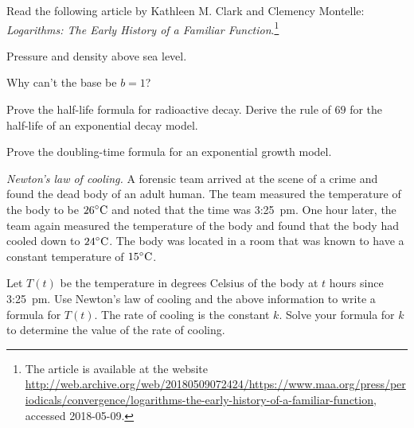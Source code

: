 \documentclass[a4paper,oneside,12pt]{article}
\begin{document}
\begin{problem}
\item Read the following article by Kathleen M. Clark and Clemency
  Montelle:
  \emph{Logarithms: The Early History of a Familiar Function}.\footnote{
    The article is available at the website
    \url{http://web.archive.org/web/20180509072424/https://www.maa.org/press/periodicals/convergence/logarithms-the-early-history-of-a-familiar-function},
    accessed 2018-05-09.
  }

\item Pressure and density above sea level.

\item Why can't the base be $b = 1$?

\item Prove the half-life formula for radioactive decay.  Derive the
  rule of $69$ for the half-life of an exponential decay model.

\item Prove the doubling-time formula for an exponential growth
  model.

\item\emph{Newton's law of cooling.}
  A forensic team arrived at the scene of a crime and found the dead
  body of an adult human.  The team measured the temperature of the
  body to be ${26}^{\circ}\textrm{C}$ and noted that the time was 3:25~pm.  One
  hour later, the team again measured the temperature of the body and
  found that the body had cooled down to ${24}^{\circ}\textrm{C}$.  The body was
  located in a room that was known to have a constant temperature of
  ${15}^{\circ}\textrm{C}$.
  \begin{packedenum}
  \item\label{subprob:logarithm:Newton_forensic_formula}
    Let $T(t)$ be the temperature in degrees Celsius of the body at
    $t$ hours since 3:25~pm.  Use Newton's law of cooling and the
    above information to write a formula for $T(t)$.  The rate of
    cooling is the constant $k$.  Solve your formula for $k$ to
    determine the value of the rate of cooling.


\end{packedenum}
\end{problem}
\end{document}
